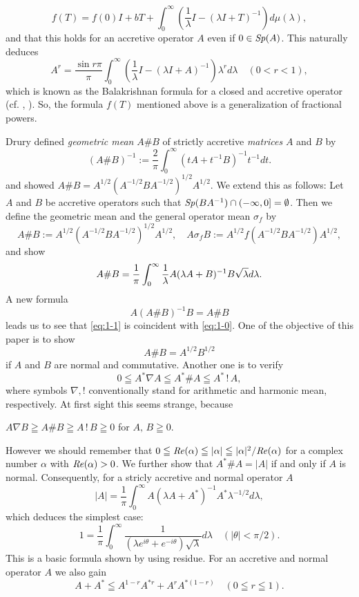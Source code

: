 \documentclass[10pt,a4paper]{amsart}
\begin{document}
$$ f(T)=  f(0) I  + b T + \int_0^{\infty} \left(\frac{1}{\lambda } I - (\lambda I  + T)^{-1}\right)d\mu(\lambda), $$
and that this holds for an accretive operator $A$ even if $0\in {\it Sp}(A)$.
This naturally deduces 
$$A^r = \frac{\sin r \pi}{\pi} \int_0^{\infty} 
 (\frac{1}{\lambda} I - (\lambda I + A)^{-1}) \lambda ^{r} d\lambda \quad (0<r<1),$$
which is known as the Balakrishnan formula\cite{Bal} for a closed and accretive operator
 (cf. \cite{N-F}, \cite{Kato-book}).
  So, the formula $f(T)$ mentioned above is a generalization of fractional powers. \par
 Drury \cite{Drury}
defined {\it geometric mean} $A\# B$ of strictly accretive {\it matrices} $A$ and $B$ by 
\begin{equation}\label{eq:1-0}
(A\# B)^{-1}:= \frac{2}{\pi} \int_0^{\infty} (tA + t^{-1} B)^{-1} t^{-1} d t.
\end{equation}
and showed $A \# B = A^{1/2} (A^{-1/2} B A^{-1/2})^{1/2} A^{1/2}$. We extend this as follows: 
Let $A$ and $B$ be accretive operators such that  
${\it Sp}(BA^{-1}) \cap (-\infty, 0] = \emptyset$.  
Then we define the geometric mean and the general operator mean $\sigma_f$ by 
$$A\#B:=A^{1/2} (A^{-1/2} B A^{-1/2})^{1/2} A^{1/2}, \quad A\sigma_f B:= A^{1/2} 
f( A^{-1/2} B A^{-1/2}) A^{1/2},$$
and show 
\begin{equation}\label{eq:1-1}
A\#B= \frac{1}{\pi}\int_0^{\infty} \frac{1}{\lambda} 
A ( \lambda A + B)^{-1} B \sqrt{\lambda} d\lambda.\\
\end{equation}
A new formula  
$$A (A\# B)^{-1} B= A \# B$$
leads us to see that  \eqref{eq:1-1}  is coincident with \eqref{eq:1-0}. 
One of the objective of this paper is to show 
$$A\#B = A^{1/2} B^{1/2}$$
if $A$ and  $B$ are normal and commutative. Another one is to verify  
$$0\leqq A^*\nabla A \leqq A^* \# A \leqq A^* \,!\, A,$$
where symbols $\nabla, !$ conventionally stand for arithmetic and harmonic mean, 
respectively. At first sight this seems strange, because 
\begin{center}
$A \nabla B \geqq A \# B \geqq A \,!\, B\geqq 0$ for $A, \,B \geqq 0$.
\end{center}
However we should remember that $0\leqq {\it Re}(\alpha) \leqq |\alpha| \leqq 
|\alpha |^2 /{\it Re}(\alpha)$ for a complex number $\alpha$ with 
${\it Re}(\alpha) >0$.
We further show that $A^* \# A = | A |$ if and only if $A$ is normal. Consequently, for 
a stricly accretive and normal operator $A$  
$$|A|=  \frac{1}{\pi}\int_0^{\infty}A (\lambda A + A^*)^{-1} A^* 
\lambda^{-1/2} d \lambda , $$
which deduces the simplest case:
$$1 = \frac{1}{\pi} \int_0^{\infty} \frac{1}{(\lambda e^{i\theta}  +  e^{-i\theta})
\sqrt{\lambda} } d \lambda \quad (|\theta | < \pi/2). $$
This is a basic formula shown by using residue.
For an accretive and normal operator $A$ we also gain 
$$A + A^* \leqq   A^{1-r} A^{*r} + A^r A^{*(1-r)} \quad (0\leqq r \leqq 1).$$
\end{document}
